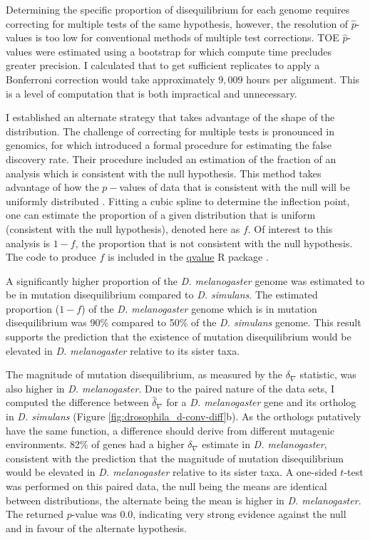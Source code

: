 

Determining the specific proportion of disequilibrium for each genome requires correcting for multiple tests of the same hypothesis, however, the resolution of $\hat p$-values is too low for conventional methods of multiple test corrections. TOE $\hat p$-values were estimated using a bootstrap for which compute time precludes greater precision. I calculated that to get sufficient replicates to apply a Bonferroni correction would take approximately $9,009$ hours per alignment. This is a level of computation that is both impractical and unnecessary. 

I established an alternate strategy that takes advantage of the shape of the distribution. The challenge of correcting for multiple tests is pronounced in genomics, for which \cite{Storey2003StatisticalStudies} introduced a formal procedure for estimating the false discovery rate. Their procedure included an estimation of the fraction of an analysis which is consistent with the null hypothesis. This method takes advantage of how the $p-$values of data that is consistent with the null will be uniformly distributed \citep[see Figure 1][]{Storey2003StatisticalStudies}. Fitting a cubic spline to determine the inflection point, one can estimate the proportion of a given distribution that is uniform (consistent with the null hypothesis), denoted here as $f$. Of interest to this analysis is $1 - f$, the proportion that is not consistent with the null hypothesis. The code to produce $f$ is included in the \href{https://github.com/StoreyLab/qvalue}{qvalue} R package \citep{Storey2004StrongApproach}.

A significantly higher proportion of the \textit{D. melanogaster} genome was estimated to be in mutation disequilibrium compared to \textit{D. simulans}. The estimated proportion ($1 - f$) of the \textit{D. melanogaster} genome which is in mutation disequilibrium was 90\% compared to 50\% of the \textit{D. simulans} genome. This result supports the prediction that the existence of mutation disequilibrium would be elevated in \textit{D. melanogaster} relative to its sister taxa.

The magnitude of mutation disequilibrium, as measured by the $\delta_\nabla$  statistic, was also higher in \textit{D. melanogaster}. Due to the paired nature of the data sets, I computed the difference between $\hat \delta_\nabla$ for a \textit{D. melanogaster} gene and its ortholog in \textit{D. simulans} (Figure \ref{fig:drosophila_d-conv-diff}b). As the orthologs putatively have the same function, a difference should derive from different mutagenic environments. 82\% of genes had a higher $\delta_\nabla$ estimate in \textit{D. melanogaster}, consistent with the prediction that the magnitude of mutation disequilibrium would be elevated in \textit{D. melanogaster} relative to its sister taxa. A one-sided $t$-test was performed on this paired data, the null being the means are identical between distributions, the alternate being the mean is higher in \textit{D. melanogaster}. The returned $p$-value was 0.0, indicating very strong evidence against the null and in favour of the alternate hypothesis. 

